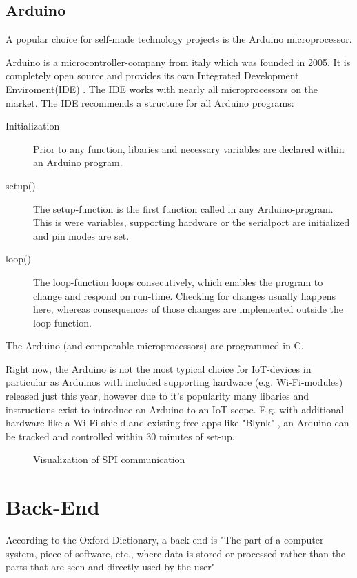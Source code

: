 \subsection{Arduino}
A popular choice for self-made technology projects is the Arduino microprocessor.

Arduino is a microcontroller-company from italy which was founded in 2005. 
It is completely open source and provides its own Integrated Development Enviroment(IDE) \parencite{arduinoIDEDownload}.
The IDE works with nearly all microprocessors on the market. 
The IDE recommends a structure for all Arduino programs:
\begin{description}
    \item [Initialization]
    Prior to any function, libaries and necessary variables are declared within an Arduino program.
    \item [setup()]
    The setup-function is the first function called in any Arduino-program. 
    This is were variables, supporting hardware or the serialport are initialized and pin modes are set. 
    \item [loop()]
    The loop-function loops consecutively, 
    which enables the program to change and respond on run-time.
    Checking for changes usually happens here, 
    whereas consequences of those changes are implemented outside the loop-function.    
\end{description}
The Arduino (and comperable microprocessors) are programmed in C.

Right now, the Arduino is not the most typical choice for IoT-devices in particular as Arduinos 
with included supporting hardware (e.g. Wi-Fi-modules) released just this year,
however due to it's popularity many libaries and instructions exist to introduce an Arduino to an IoT-scope.
E.g. with additional hardware like a Wi-Fi shield and existing free apps like "Blynk"  \parencite{blynk}, 
an Arduino can be tracked and controlled within 30 minutes of set-up.

\begin{figure}[h]
	\centering
	\caption{Visualization of SPI communication}
  \end{figure}



\section{Back-End}
According to the Oxford Dictionary, a back-end is 
"The part of a computer system, piece of software, etc., where data is stored or processed rather 
than the parts that are seen and directly used by the user" \parencite{backendDef}

